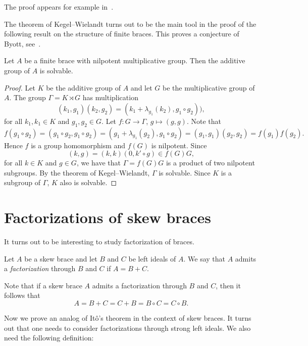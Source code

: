 The proof appears for example in~\cite[Theorem 2.4.3]{MR1211633}. 

The theorem of Kegel--Wielandt turns out to be the main tool in the proof of the following result 
on the structure of finite braces. 
This proves a conjecture 
of Byott, see~\cite{MR3425626}.

\begin{theorem}
\label{thm:mul_nilpotent}
Let $A$ be a finite brace with nilpotent multiplicative group. Then 
the additive group of $A$ is solvable.
\end{theorem}

\begin{proof}
    Let $K$ be the additive group of $A$ and let $G$ be the multiplicative group of $A$. The group
    $\Gamma=K\rtimes G$ has multiplication
    \[
    (k_1,g_1)(k_2,g_2)=(k_1+\lambda_{g_1}(k_2),g_1\circ g_2)),
    \]
    for all $k_1,k_1\in K$ and $g_1,g_2\in G$.
    Let $f\colon G\to\Gamma$, $g\mapsto(g,g)$. Note that
    \[ f(g_1\circ g_2)=(g_1\circ g_2,g_1\circ g_2)=(g_1+\lambda_{g_1}(g_2),g_1\circ g_2)=(g_1,g_1)(g_2,g_2)=f(g_1)f(g_2).\]
    Hence $f$ is a group homomorphism and  $f(G)$ is nilpotent. Since
    \[(k,g)=(k,k)(0,k'\circ g)\in f(G)G,\]
    for all $k\in K$ and $g\in G$, we have that $\Gamma=f(G)G$ is a product of two nilpotent subgroups.
    By the theorem of Kegel--Wielandt, $\Gamma$ is solvable. Since $K$ is a subgroup of $\Gamma$, $K$ also is solvable.
\end{proof}

\section{Factorizations of skew braces}

It turns out to be interesting to study factorization of braces. 

\begin{definition}
    Let $A$ be a skew brace and let $B$ and $C$ be left ideals of $A$. We say
    that $A$ admits a \emph{factorization} through $B$ and $C$ if $A=B+C$.
\end{definition}

Note that if a skew brace $A$ admits a factorization through $B$ and $C$, then  
it follows that
\[
A=B+C=C+B=B\circ C=C\circ B.
\]

Now we prove an analog of It\^o's theorem in the context of skew braces. 
It turns out that one needs to consider factorizations through strong left ideals. We also need
the following
definition: 

